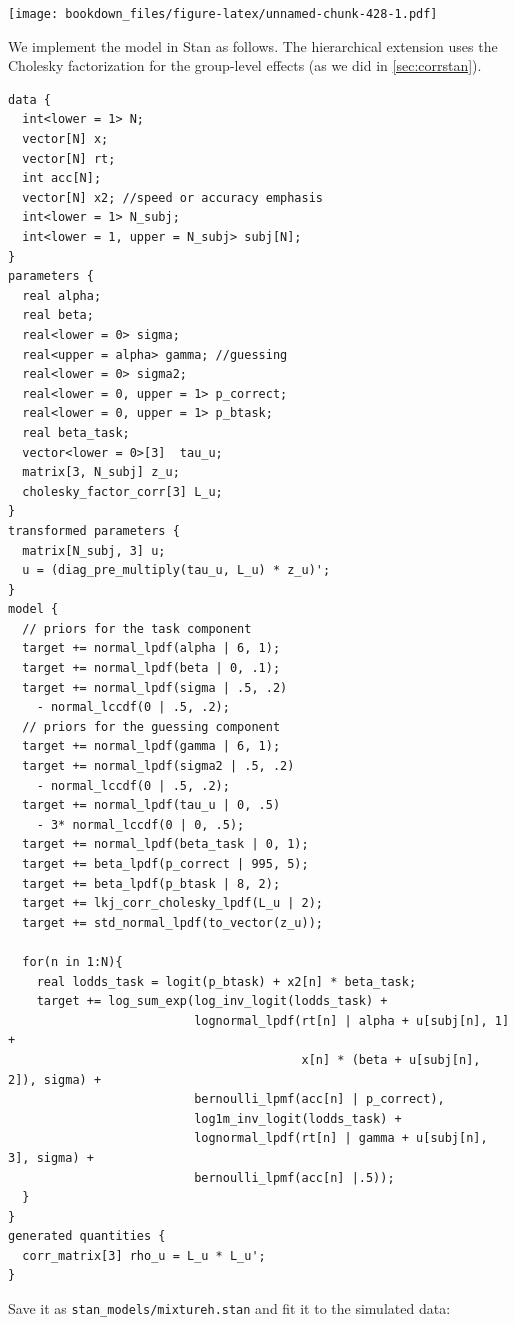 \documentclass[12pt,]{krantz}
\theoremstyle{definition}
\theoremstyle{definition}
\theoremstyle{definition}
\theoremstyle{remark}
\begin{document}
\texttt{[image: bookdown\_files/figure-latex/unnamed-chunk-428-1.pdf]}

We implement the model in Stan as follows. The hierarchical extension uses the Cholesky factorization for the group-level effects (as we did in \ref{sec:corrstan}).

\begin{verbatim}
data {
  int<lower = 1> N;
  vector[N] x;
  vector[N] rt;
  int acc[N];
  vector[N] x2; //speed or accuracy emphasis
  int<lower = 1> N_subj;
  int<lower = 1, upper = N_subj> subj[N];
}
parameters {
  real alpha;
  real beta;
  real<lower = 0> sigma;
  real<upper = alpha> gamma; //guessing
  real<lower = 0> sigma2;
  real<lower = 0, upper = 1> p_correct;
  real<lower = 0, upper = 1> p_btask;
  real beta_task;
  vector<lower = 0>[3]  tau_u;   
  matrix[3, N_subj] z_u;
  cholesky_factor_corr[3] L_u;
}
transformed parameters {
  matrix[N_subj, 3] u;
  u = (diag_pre_multiply(tau_u, L_u) * z_u)';
}
model {
  // priors for the task component
  target += normal_lpdf(alpha | 6, 1);
  target += normal_lpdf(beta | 0, .1);
  target += normal_lpdf(sigma | .5, .2)
    - normal_lccdf(0 | .5, .2);
  // priors for the guessing component
  target += normal_lpdf(gamma | 6, 1);
  target += normal_lpdf(sigma2 | .5, .2)
    - normal_lccdf(0 | .5, .2);
  target += normal_lpdf(tau_u | 0, .5)
    - 3* normal_lccdf(0 | 0, .5);
  target += normal_lpdf(beta_task | 0, 1);
  target += beta_lpdf(p_correct | 995, 5);
  target += beta_lpdf(p_btask | 8, 2);
  target += lkj_corr_cholesky_lpdf(L_u | 2);
  target += std_normal_lpdf(to_vector(z_u));

  for(n in 1:N){
    real lodds_task = logit(p_btask) + x2[n] * beta_task;
    target += log_sum_exp(log_inv_logit(lodds_task) +
                          lognormal_lpdf(rt[n] | alpha + u[subj[n], 1] +
                                         x[n] * (beta + u[subj[n], 2]), sigma) +
                          bernoulli_lpmf(acc[n] | p_correct),
                          log1m_inv_logit(lodds_task) +
                          lognormal_lpdf(rt[n] | gamma + u[subj[n], 3], sigma) +
                          bernoulli_lpmf(acc[n] |.5));
  }
}
generated quantities {
  corr_matrix[3] rho_u = L_u * L_u';
}
\end{verbatim}

Save it as \texttt{stan\_models/mixtureh.stan} and fit it to the simulated data:
\end{document}
